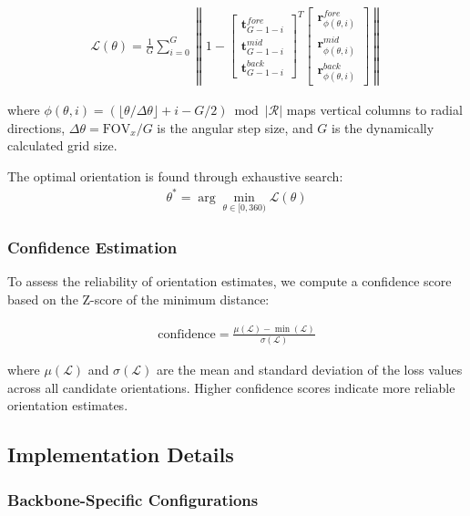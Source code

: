 \begin{align}
\mathcal{L}(\theta) = \frac{1}{G} \sum_{i=0}^{G} \left\| 1 - \begin{bmatrix} \mathbf{t}_{G-1-i}^{fore} \\ \mathbf{t}_{G-1-i}^{mid} \\ \mathbf{t}_{G-1-i}^{back} \end{bmatrix}^T \begin{bmatrix} \mathbf{r}_{\phi(\theta,i)}^{fore} \\ \mathbf{r}_{\phi(\theta,i)}^{mid} \\ \mathbf{r}_{\phi(\theta,i)}^{back} \end{bmatrix} \right\|
\end{align}

where $\phi(\theta,i) = (\lfloor\theta/\Delta\theta\rfloor + i - G/2) \bmod |\mathcal{R}|$ maps vertical columns to radial directions, $\Delta\theta = \text{FOV}_x / G$ is the angular step size, and $G$ is the dynamically calculated grid size.

The optimal orientation is found through exhaustive search:
\begin{align}
\theta^* = \arg\min_{\theta \in [0, 360)} \mathcal{L}(\theta)
\end{align}

\subsubsection{Confidence Estimation}

To assess the reliability of orientation estimates, we compute a confidence score based on the Z-score of the minimum distance:

\begin{align}
\text{confidence} = \frac{\mu(\mathcal{L}) - \min(\mathcal{L})}{\sigma(\mathcal{L})}
\end{align}

where $\mu(\mathcal{L})$ and $\sigma(\mathcal{L})$ are the mean and standard deviation of the loss values across all candidate orientations. Higher confidence scores indicate more reliable orientation estimates.

\subsection{Implementation Details}

\subsubsection{Backbone-Specific Configurations}

